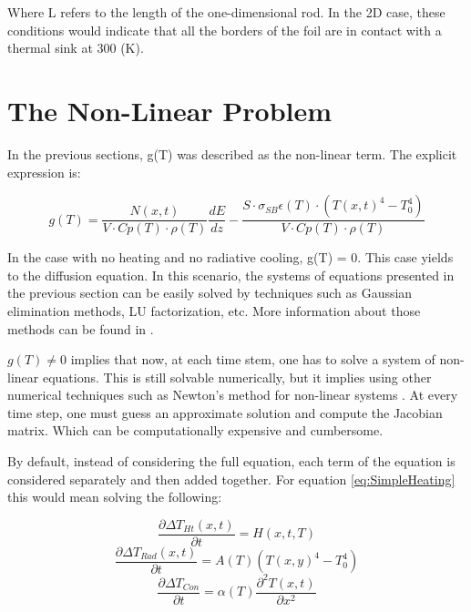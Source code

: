 Where L refers to the length of the one-dimensional rod. In the 2D case, these conditions would indicate that all the borders of the foil are in contact with a thermal sink at 300 (K). 

\section{The Non-Linear Problem}

In the previous sections, g(T) was described as the non-linear term. The explicit expression is: 

\begin{equation}
    g(T) = \frac{N(x,t)}{V\cdot Cp(T)\cdot \rho(T)}\frac{dE}{dz} - \frac{S\cdot \sigma_{SB}\epsilon(T)\cdot \left( T(x,t)^4 - T_0^4\right)}{V\cdot Cp(T)\cdot \rho(T)}
\end{equation}

In the case with no heating and no radiative cooling, g(T) = 0. This case yields to the diffusion equation. In this scenario, the systems of equations presented in the previous section can be easily solved by techniques such as Gaussian elimination methods, LU factorization, etc. More information about those methods can be found in \parencite[][]{ref:AlvaroBook}. 

$g(T) \neq 0$ implies that now, at each time stem, one has to solve a system of non-linear equations. This is still solvable numerically, but it implies using other numerical techniques such as Newton's method for non-linear systems \parencite[][]{ref:AlvaroBook}. At every time step, one must guess an approximate solution and compute the Jacobian matrix. Which can be computationally expensive and cumbersome. 

By default, instead of considering the full equation, each term of the equation is considered separately and then added together. For equation \ref{eq:SimpleHeating} this would mean solving the following: 

\begin{equation}
    \frac{\partial \Delta T_{Ht} (x,t)}{\partial t} = H(x,t,T)
\end{equation}
\begin{equation}
    \frac{\partial \Delta T_{Rad} (x,t)}{\partial t} = A(T) \left(T(x,y)^4 - T_0^4\right)
\end{equation}
\begin{equation}
    \frac{\partial \Delta T_{Con}}{\partial t} = \alpha(T)\frac{\partial^2 T(x,t)}{\partial x^2}
\end{equation}


